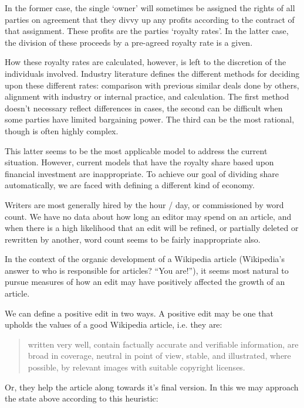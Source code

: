In the former case, the single `owner' will sometimes be assigned the
rights of all parties on agreement that they divvy up any profits
according to the contract of that assignment. These profits are the
parties `royalty rates'. In the latter case, the division of these
proceeds by a pre-agreed royalty rate is a given.

How these royalty rates are calculated, however, is left to the
discretion of the individuals involved. Industry literature defines
the different methods for deciding upon these different rates:
comparison with previous similar deals done by others, alignment with
industry or internal practice, and calculation. The first method
doesn't necessary reflect differences in cases, the second can be
difficult when some parties have limited bargaining power. The third
can be the most rational, though is often highly
complex.\cite{simplemethod}

This latter seems to be the most applicable model to address the
current situation. However, current models that have the royalty share
based upon financial investment are inappropriate.\cite{simplemethod}
To achieve our goal of dividing share automatically, we are faced with
defining a different kind of economy.

Writers are most generally hired by the hour / day, or commissioned by
word count.\cite{copywriter-rates} We have no data about how long an
editor may spend on an article, and when there is a high likelihood
that an edit will be refined, or partially deleted or rewritten by
another, word count seems to be fairly inappropriate also.

In the context of the organic development of a Wikipedia article
(Wikipedia's answer to who is responsible for articles? ``You
are!''\cite{wiki-you-are}), it seems most natural to pursue measures
of how an edit may have positively affected the growth of an
article.

We can define a positive edit in two ways. A positive edit may
be one that upholds the values of a good Wikipedia article, i.e. they
are:

\begin{quote}
  written very well, contain factually accurate and verifiable
  information, are broad in coverage, neutral in point of view,
  stable, and illustrated, where possible, by relevant images with
  suitable copyright licenses.\cite{wiki-good}
\end{quote}

Or, they help the article along towards it's final version. In this we
may approach the state above according to this heuristic:

